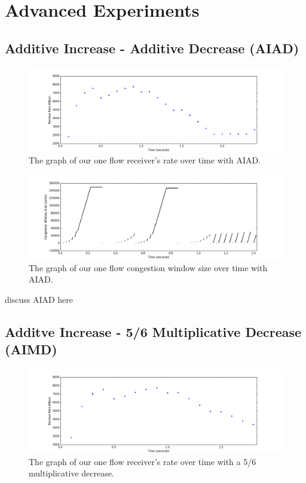 \documentclass[11pt]{article}
\begin{document}
\section{Advanced Experiments}


\subsection{Additive Increase - Additive Decrease (AIAD)}

\begin{figure}[H]
\caption{The graph of our one flow receiver's rate over time with AIAD.}
  \label{figure13}
    \centering
    \includegraphics[width=\linewidth]{1f_rateAIAD.png}
\end{figure}

\begin{figure}[H]
\caption{The graph of our one flow congestion window size over time with AIAD.}
  \label{figure14}
    \centering
    \includegraphics[width=\linewidth]{1f_windowAIAD.png}
\end{figure}


discuss AIAD here

\subsection{Additve Increase - 5/6 Multiplicative Decrease (AIMD)}

\begin{figure}[H]
\caption{The graph of our one flow receiver's rate over time with a 5/6 multiplicative decrease.}
  \label{figure15}
    \centering
    \includegraphics[width=\linewidth]{1f_rateAIMD.png}
\end{figure}
\end{document}
